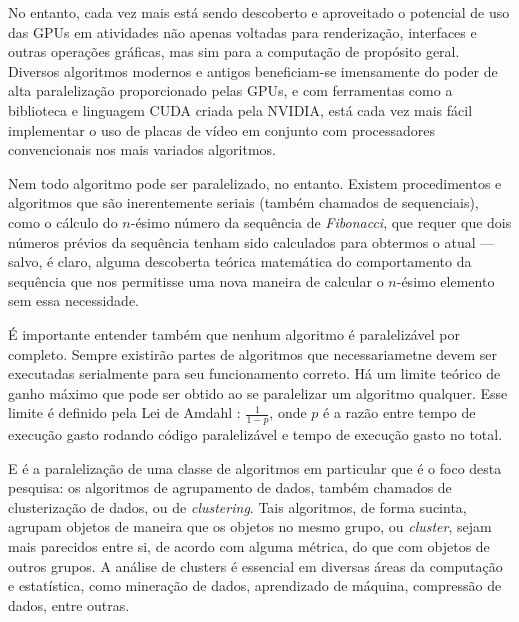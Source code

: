 \documentclass[12pt, %
openright, 
oneside, %
a4paper,    %
brazil]{facom-ufu-abntex2}
\begin{document}
No entanto, cada vez mais está sendo descoberto e aproveitado o potencial de uso das GPUs em atividades não apenas voltadas para renderização, interfaces e outras operações gráficas, mas sim para a computação de propósito geral. Diversos algoritmos modernos e antigos beneficiam-se imensamente do poder de alta paralelização proporcionado pelas GPUs, e com ferramentas como a biblioteca e linguagem CUDA criada pela NVIDIA, está cada vez mais fácil implementar o uso de placas de vídeo em conjunto com processadores convencionais nos mais variados algoritmos.

Nem todo algoritmo pode ser paralelizado, no entanto. Existem procedimentos e algoritmos que são inerentemente seriais (também chamados de sequenciais), como o cálculo do $n$-ésimo número da sequência de \textit{Fibonacci}, que requer que dois números prévios da sequência tenham sido calculados para obtermos o atual --- salvo, é claro, alguma descoberta teórica matemática do comportamento da sequência que nos permitisse uma nova maneira de calcular o $n$-ésimo elemento sem essa necessidade.

É importante entender também que nenhum algoritmo é paralelizável por completo. Sempre existirão partes de algoritmos que necessariametne devem ser executadas serialmente para seu funcionamento correto. Há um limite teórico de ganho máximo que pode ser obtido ao se paralelizar um algoritmo qualquer. Esse limite é definido pela Lei de Amdahl \cite{Amdahl-Law}: $\frac{1}{1-p}$, onde $p$ é a razão entre tempo de execução gasto rodando código paralelizável e tempo de execução gasto no total.



E é a paralelização de uma classe de algoritmos em particular que é o foco desta pesquisa: os algoritmos de agrupamento de dados, também chamados de clusterização de dados, ou de \textit{clustering}. Tais algoritmos, de forma sucinta, agrupam objetos de maneira que os objetos no mesmo grupo, ou \textit{cluster}, sejam mais parecidos entre si, de acordo com alguma métrica, do que com objetos de outros grupos. A análise de clusters é essencial em diversas áreas da computação e estatística, como mineração de dados, aprendizado de máquina, compressão de dados, entre outras.
\end{document}
